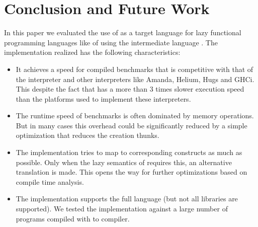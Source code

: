 \section{Conclusion and Future Work}\label{sapljs:sec:conclusions}
In this paper we evaluated the use of \JS as a target language for lazy functional programming languages like \Haskell of \Clean using the intermediate language \Sapl.
The implementation realized has the following characteristics:

\begin{itemize}
\item It achieves a speed for compiled benchmarks 
that is competitive with that of the  \Sapl interpreter and other interpreters like \textsf{Amanda}, 
\textsf{Helium}, \textsf{Hugs} and \textsf{GHCi}.
This despite the fact that \JS has a more than 3 times slower execution speed 
than the platforms used to implement these interpreters.
\item The runtime speed of benchmarks is often dominated by memory operations. 
But in many cases this overhead could be significantly reduced by a simple optimization
that reduces the creation thunks.
\item  The implementation tries to map \Sapl to corresponding \JS constructs as much as possible.
Only when the lazy semantics of \Sapl requires this, an alternative translation is made.
This opens the way for further optimizations based on compile time analysis.
\item The implementation supports the full \Clean language (but not all libraries are supported).
We tested the implementation against a large number of \Clean programs compiled with \Clean to \Sapl compiler. 

\end{itemize}

